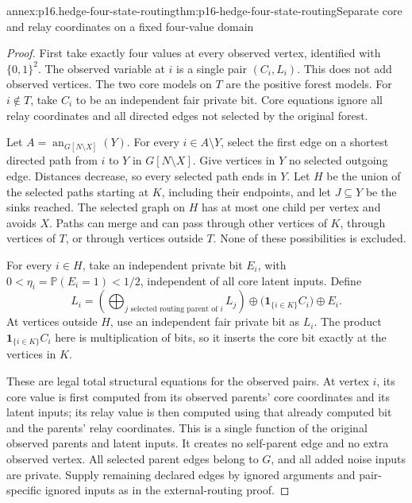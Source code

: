 \begin{annexitem}{annex:p16.hedge-four-state-routing}{thm:p16-hedge-four-state-routing}{Separate core and relay coordinates on a fixed four-value domain}
\begin{proof}
First take exactly four values at every observed vertex, identified
with \(\{0,1\}^2\). The observed variable at \(i\) is a
single pair \((C_i,L_i)\). This does not add observed vertices.
The two core models on \(T\) are the positive forest models.
For \(i\notin T\), take \(C_i\) to be an independent fair
private bit. Core equations ignore all relay coordinates and all
directed edges not selected by the original forest.

Let \(A=\operatorname{an}_{G[N\setminus X]}(Y)\). For every
\(i\in A\setminus Y\), select the first edge on a shortest
directed path from \(i\) to \(Y\) in \(G[N\setminus X]\).
Give vertices in \(Y\) no selected outgoing edge. Distances
decrease, so every selected path ends in \(Y\). Let \(H\)
be the union of the selected paths starting at \(K\), including
their endpoints, and let \(J\subseteq Y\) be the sinks reached.
The selected graph on \(H\) has at most one child per vertex
and avoids \(X\). Paths can merge and can pass through other
vertices of \(K\), through vertices of \(T\), or through
vertices outside \(T\). None of these possibilities is excluded.

For every \(i\in H\), take an independent private bit \(E_i\),
with \(0<\eta_i=\mathbb P(E_i=1)<1/2\), independent of all
core latent inputs. Define
\[
 L_i=\left(\bigoplus_{j\text{ selected routing parent of }i}L_j\right)
       \oplus \bigl(\mathbf1_{\{i\in K\}}C_i\bigr)\oplus E_i.
\]
At vertices outside \(H\), use an independent fair private bit
as \(L_i\). The product \(\mathbf1_{\{i\in K\}}C_i\)
here is multiplication of bits, so it inserts the core bit exactly
at the vertices in \(K\).

These are legal total structural equations for the observed pairs.
At vertex \(i\), its core value is first computed from its
observed parents' core coordinates and its latent inputs; its relay
value is then computed using that already computed bit and the
parents' relay coordinates. This is a single function of the original
observed parents and latent inputs. It creates no self-parent edge
and no extra observed vertex. All selected parent edges belong to
\(G\), and all added noise inputs are private. Supply remaining
declared edges by ignored arguments and pair-specific ignored inputs
as in the external-routing proof.


\end{proof}
\end{annexitem}

